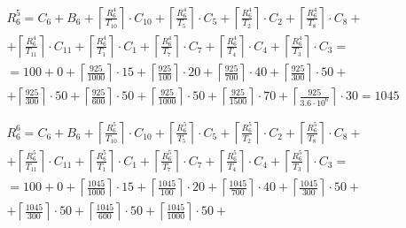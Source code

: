 \begin{gather*}
  \begin{multlined}
    R_6^5 = C_6 + B_6 + \left\lceil\frac{R_6^4}{T_{10}}\right\rceil\cdot C_{10} + %
    \left\lceil\frac{R_6^4}{T_5}\right\rceil\cdot C_5 + %
    \left\lceil\frac{R_6^4}{T_2}\right\rceil\cdot C_2 + %
    \left\lceil\frac{R_6^4}{T_8}\right\rceil\cdot C_8 + \\%
    + \left\lceil\frac{R_6^4}{T_{11}}\right\rceil\cdot C_{11} + %
    \left\lceil\frac{R_6^4}{T_1}\right\rceil\cdot C_1 +%
    \left\lceil\frac{R_6^4}{T_7}\right\rceil\cdot C_7 +%
    \left\lceil\frac{R_6^4}{T_4}\right\rceil\cdot C_4 +%
    \left\lceil\frac{R_6^4}{T_3}\right\rceil\cdot C_3 = \\%
    = 100 + 0 + \left\lceil\frac{925}{1000}\right\rceil\cdot 15 + %
    \left\lceil\frac{925}{100}\right\rceil\cdot 20 + %
    \left\lceil\frac{925}{700}\right\rceil\cdot 40 + %
    \left\lceil\frac{925}{300}\right\rceil\cdot 50 + \\%
    + \left\lceil\frac{925}{300}\right\rceil\cdot 50 + %
    \left\lceil\frac{925}{600}\right\rceil\cdot 50 + %
    \left\lceil\frac{925}{1000}\right\rceil\cdot 50 +%
    \left\lceil\frac{925}{1500}\right\rceil\cdot 70 +%
    \left\lceil\frac{925}{3.6 \cdot 10^6}\right\rceil\cdot 30 = 1045 \\
  \end{multlined} \\
  \begin{multlined}
    R_6^6 = C_6 + B_6 + \left\lceil\frac{R_6^5}{T_{10}}\right\rceil\cdot C_{10} + %
    \left\lceil\frac{R_6^5}{T_5}\right\rceil\cdot C_5 + %
    \left\lceil\frac{R_6^5}{T_2}\right\rceil\cdot C_2 + %
    \left\lceil\frac{R_6^5}{T_8}\right\rceil\cdot C_8 + \\%
    + \left\lceil\frac{R_6^5}{T_{11}}\right\rceil\cdot C_{11} + %
    \left\lceil\frac{R_6^5}{T_1}\right\rceil\cdot C_1 +%
    \left\lceil\frac{R_6^5}{T_7}\right\rceil\cdot C_7 +%
    \left\lceil\frac{R_6^5}{T_4}\right\rceil\cdot C_4 +%
    \left\lceil\frac{R_6^5}{T_3}\right\rceil\cdot C_3 = \\%
    = 100 + 0 + \left\lceil\frac{1045}{1000}\right\rceil\cdot 15 + %
    \left\lceil\frac{1045}{100}\right\rceil\cdot 20 + %
    \left\lceil\frac{1045}{700}\right\rceil\cdot 40 + %
    \left\lceil\frac{1045}{300}\right\rceil\cdot 50 + \\%
    + \left\lceil\frac{1045}{300}\right\rceil\cdot 50 + %
    \left\lceil\frac{1045}{600}\right\rceil\cdot 50 + %
    \left\lceil\frac{1045}{1000}\right\rceil\cdot 50 +%

\end{multlined}
\end{gather*}
